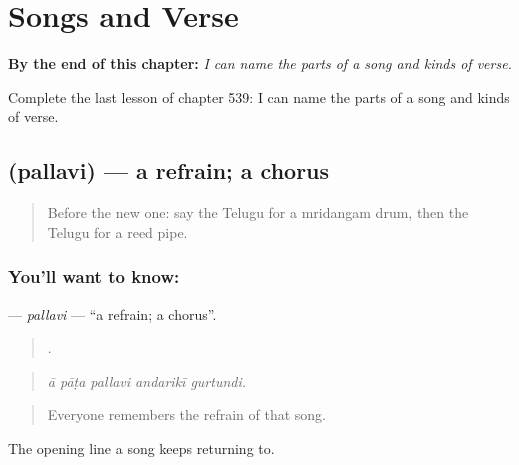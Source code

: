 
\chapter{Songs and Verse}
\label{ch:te-songs-and-verse}

\begin{chapteropening}
\textbf{By the end of this chapter:} \emph{I can name the parts of a song and kinds of verse.}

Complete the last lesson of chapter 539: I can name the parts of a song and kinds of verse.
\end{chapteropening}

\section[\texorpdfstring{\te{పల్లవి} (pallavi)}{పల్లవి (pallavi)}]{ (pallavi) — a refrain; a chorus}

\label{lesson:TE-C539-pallavi}



\begin{quote}
Before the new one: say the Telugu for a mridangam drum, then the Telugu for a reed pipe.
\end{quote}

\subsection*{You'll want to know: }
\textbf{} — \emph{pallavi} — \textquotedblleft{}a refrain; a chorus\textquotedblright{}.

\begin{quote}
    .
\end{quote}

\begin{quote}
\emph{ā pāṭa pallavi andarikī gurtundi.}
\end{quote}

\begin{quote}
Everyone remembers the refrain of that song.
\end{quote}

The opening line a song keeps returning to.

